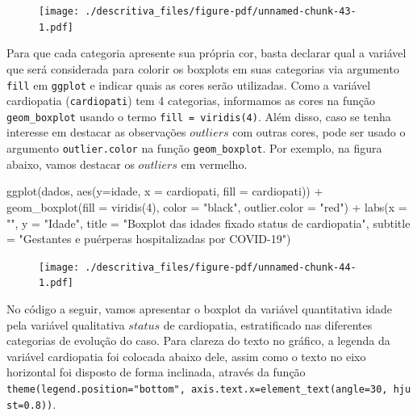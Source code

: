 \documentclass[
  letterpaper,
  DIV=11,
  numbers=noendperiod]{scrreprt}
\newenvironment{Shaded}{\begin{snugshade}}{\end{snugshade}}
\newcommand{\AttributeTok}[1]{\textcolor[rgb]{0.40,0.45,0.13}{#1}}
\newcommand{\DecValTok}[1]{\textcolor[rgb]{0.68,0.00,0.00}{#1}}
\newcommand{\FunctionTok}[1]{\textcolor[rgb]{0.28,0.35,0.67}{#1}}
\newcommand{\NormalTok}[1]{\textcolor[rgb]{0.00,0.23,0.31}{#1}}
\newcommand{\SpecialCharTok}[1]{\textcolor[rgb]{0.37,0.37,0.37}{#1}}
\newcommand{\StringTok}[1]{\textcolor[rgb]{0.13,0.47,0.30}{#1}}
\begin{document}
\begin{figure}[H]

{\centering \texttt{[image: ./descritiva\_files/figure-pdf/unnamed-chunk-43-1.pdf]}

}

\end{figure}

Para que cada categoria apresente sua própria cor, basta declarar qual a
variável que será considerada para colorir os boxplots em suas
categorias via argumento \texttt{fill} em \texttt{ggplot} e indicar
quais as cores serão utilizadas. Como a variável cardiopatia
(\texttt{cardiopati}) tem 4 categorias, informamos as cores na função
\texttt{geom\_boxplot} usando o termo \texttt{fill\ =\ viridis(4)}. Além
disso, caso se tenha interesse em destacar as observações \(outliers\)
com outras cores, pode ser usado o argumento \texttt{outlier.color} na
função \texttt{geom\_boxplot}. Por exemplo, na figura abaixo, vamos
destacar os \(outliers\) em vermelho.

\begin{Shaded}
\begin{Highlighting}[]
\FunctionTok{ggplot}\NormalTok{(dados, }\FunctionTok{aes}\NormalTok{(}\AttributeTok{y=}\NormalTok{idade, }\AttributeTok{x =}\NormalTok{ cardiopati, }\AttributeTok{fill =}\NormalTok{ cardiopati))  }\SpecialCharTok{+} 
  \FunctionTok{geom\_boxplot}\NormalTok{(}\AttributeTok{fill =} \FunctionTok{viridis}\NormalTok{(}\DecValTok{4}\NormalTok{), }\AttributeTok{color =} \StringTok{"black"}\NormalTok{, }\AttributeTok{outlier.color =} \StringTok{"red"}\NormalTok{) }\SpecialCharTok{+}
  \FunctionTok{labs}\NormalTok{(}\AttributeTok{x =} \StringTok{""}\NormalTok{, }\AttributeTok{y =} \StringTok{"Idade"}\NormalTok{, }\AttributeTok{title =} \StringTok{"Boxplot das idades fixado status de cardiopatia"}\NormalTok{, }\AttributeTok{subtitle =} \StringTok{"Gestantes e puérperas hospitalizadas por COVID{-}19"}\NormalTok{)}
\end{Highlighting}
\end{Shaded}

\begin{figure}[H]

{\centering \texttt{[image: ./descritiva\_files/figure-pdf/unnamed-chunk-44-1.pdf]}

}

\end{figure}

No código a seguir, vamos apresentar o boxplot da variável quantitativa
idade pela variável qualitativa \(status\) de cardiopatia, estratificado
nas diferentes categorias de evolução do caso. Para clareza do texto no
gráfico, a legenda da variável cardiopatia foi colocada abaixo dele,
assim como o texto no eixo horizontal foi disposto de forma inclinada,
através da função
\texttt{theme(legend.position="bottom",\ axis.text.x=element\_text(angle=30,\ hjust=0.8))}.
\end{document}

